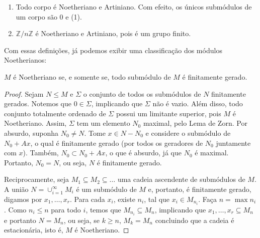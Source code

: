 \begin{examples}
\begin{enumerate}


		\item Todo corpo é Noetheriano e Artiniano. Com efeito, os únicos submódulos de um corpo são 0 e (1).
		\item $\mathbb{Z}/n\mathbb{Z}$ é Noetheriano e Artiniano, pois é um grupo finito.
	\end{enumerate}
\end{examples}
Com essas definições, já podemos exibir uma classificação dos módulos Noetherianos:
\begin{theorem}
	\label{loc:6.2_:_equivalência_de_noetherianos}
	$M$ é Noetheriano se, e somente se, todo submódulo de $M$ é finitamente gerado.
	\begin{proof}

		Sejam $N\leq M$ e $\Sigma$ o conjunto de todos os submódulos de $N$ finitamente gerados.
		Notemos que $0 \in \Sigma$, implicando que $\Sigma$ não é vazio. Além disso, todo conjunto totalmente ordenado de $\Sigma$ possui um limitante superior, pois $M$ é Noetheriano. Assim, $\Sigma$ tem um elemento $N_0$ maximal, pelo Lema de Zorn.
		Por absurdo, suponha $N_{0}\neq N$. Tome $x \in N-N_{0}$ e considere o submódulo de $N_{0}+Ax$, o qual é finitamente gerado (por todos os geradores de $N_{0}$ juntamente com $x$).
		Também, $N_{0}\subset N_{0}+Ax$, o que é absurdo, já que $N_{0}$ é maximal. Portanto, $N_{0}=N$, ou seja, $N$ é finitamente gerado.

		Reciprocamente, seja $M_{1}\subseteq M_{2}\subseteq\dots$ uma cadeia ascendente de submódulos de $M$.
		A união $N=\cup_{i=1}^{\infty}M_{i}$ é um submódulo de $M$ e, portanto, é finitamente gerado, digamos por $x_{1}, \dots, x_{r}$.
		Para cada $x_{i}$, existe $n_{i}$, tal que $x_{i} \in M_{n_{i}}$. Faça $n=\max {n_{i}}$. Como $n_{i}\leq n$ para todo $i$, temos que $M_{n_{i}}\subseteq M_{n}$, implicando que ${x_{1}, \dots, x_{r}}\subseteq M_{n}$ e portanto $N=M_{n}$, ou seja, se $k\geq n$, $M_{k}=M_{n}$ concluindo que a cadeia é estacionária, isto é, $M$ é Noetheriano.
	\end{proof}
\end{theorem}
